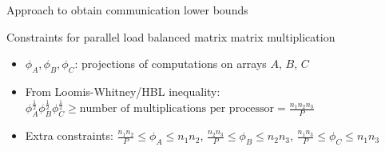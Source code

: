 \documentclass[aspectratio=169]{beamer}
\begin{document}
\begin{frame}{Approach to obtain communication lower bounds}
{\begin{block}{\small Constraints for parallel load balanced matrix matrix multiplication}
			\begin{itemize}[leftmargin=5.5mm]
				\item $\phi_A, \phi_B, \phi_C$: projections of computations on arrays $A$, $B$, $C$
				\item From Loomis-Whitney/HBL inequality: $\phi_A^{\frac{1}{2}} \phi_B^{\frac{1}{2}} \phi_C^{\frac{1}{2}} \ge \text{number of multiplications per processor}=\frac{n_1n_2n_3}{P}$
				\item Extra constraints: $\frac{n_1n_2}{P} \le \phi_A \le n_1n_2$, $\frac{n_2n_3}{P} \le \phi_B \le n_2n_3$, $\frac{n_1n_3}{P} \le \phi_C \le n_1n_3$
			\end{itemize}
		\end{block}
	}
\end{frame}
\end{document}
